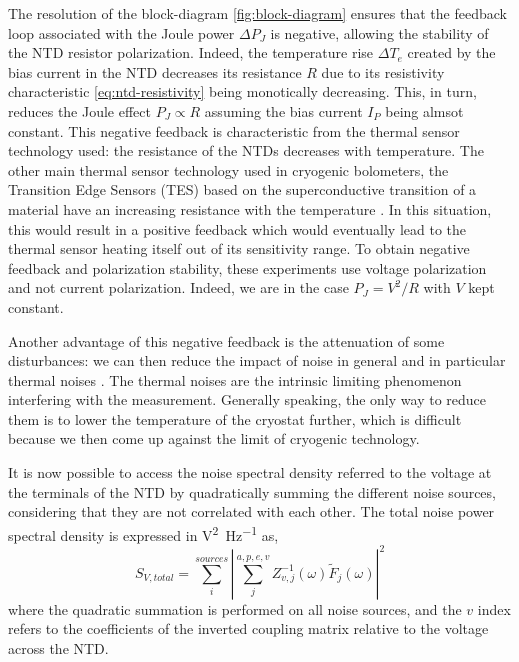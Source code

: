 The resolution of the block-diagram \ref{fig:block-diagram} ensures that the feedback loop associated with the Joule power $\Delta P_J$ is negative, allowing the stability of the NTD resistor polarization. Indeed, the temperature rise $\Delta T_e$ created by the bias current in the NTD decreases its resistance $R$ due to its resistivity characteristic \ref{eq:ntd-resistivity} being monotically decreasing. This, in turn, reduces the Joule effect $P_J \propto R$ assuming the bias current $I_P$ being almsot constant.
This negative feedback is characteristic from the thermal sensor technology used: the resistance of the NTDs decreases with temperature. The other main thermal sensor technology used in cryogenic bolometers, the Transition Edge Sensors (TES) based on the superconductive transition of a material have 
an increasing resistance with the temperature \cite{Billard:2012} \cite{Figueroa:2006}. In this situation, this would result in a positive feedback which would eventually lead to the thermal sensor heating itself out of its sensitivity range. To obtain negative feedback and polarization stability, these experiments use voltage polarization and not current polarization. Indeed, we are in the case $P_J=V^2/R$ with $V$ kept constant.

Another advantage of this negative feedback is the attenuation of some disturbances: we can then reduce the impact of noise in general and in particular thermal noises \cite{Mather:1982}. 
The thermal noises are the intrinsic limiting phenomenon interfering with the measurement. Generally speaking, the only way to reduce them is to lower the temperature of the cryostat further, which is difficult because we then come up against the limit of cryogenic technology.

It is now possible to access the noise spectral density referred to the voltage at the terminals of the NTD by quadratically summing the different noise sources, considering that they are not correlated with each other. The total noise power spectral density is expressed in \si{\volt^2\per\Hz} as,
\begin{equation}
\label{eq:ethem-psd-total}
S_{V,total} = \sum_i^{sources} \left\vert \sum_j^{a,p,e,v} Z_{v,j}^{-1} (\omega) \tilde{F}_j(\omega) \right\vert^2
\end{equation}
where the quadratic summation is performed on all noise sources, and the $v$ index refers to the coefficients of the inverted coupling matrix relative to the voltage across the NTD.

